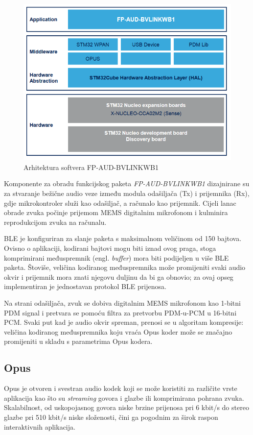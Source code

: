 \begin{figure}[ht]
	\includegraphics[width=\linewidth]{imgs/firmware_software_arch}
	\caption{Arhitektura softvera FP-AUD-BVLINKWB1}
	\label{fig:firmware_software_arch}
\end{figure}

Komponente za obradu funkcijskog paketa \textit{FP-AUD-BVLINKWB1} dizajnirane su za stvaranje bežične audio veze između modula odašiljača (Tx) i prijemnika (Rx), gdje mikrokontroler služi kao odašiljač, a računalo kao prijemnik. Cijeli lanac obrade zvuka počinje prijemom MEMS digitalnim mikrofonom i kulminira reprodukcijom zvuka na računalu.

BLE je konfiguriran za slanje paketa s maksimalnom veličinom od 150 bajtova. Ovisno o aplikaciji, kodirani bajtovi mogu biti iznad ovog praga, stoga komprimirani međuspremnik (engl. \textit{buffer}) mora biti podijeljen u više BLE paketa. Štoviše, veličina kodiranog međuspremnika može promijeniti svaki audio okvir i prijemnik mora znati njegovu duljinu da bi ga obnovio; za ovaj opseg implementiran je jednostavan protokol BLE prijenosa.

Na strani odašiljača, zvuk se dobiva digitalnim MEMS mikrofonom kao 1-bitni PDM signal i pretvara se pomoću filtra za pretvorbu PDM-u-PCM u 16-bitni PCM. Svaki put kad je audio okvir spreman, prenosi se u algoritam kompresije: veličina kodiranog međuspremnika koju vraća Opus koder može se značajno promijeniti u skladu s parametrima Opus kodera.

\subsection{Opus}
Opus je otvoren i svestran audio kodek koji se može koristiti za različite vrste aplikacija kao što su \textit{streaming} govora i glazbe ili komprimirana pohrana zvuka. Skalabilnost, od uskopojasnog govora niske brzine prijenosa pri 6 kbit/s do stereo glazbe pri 510 kbit/s niske složenosti, čini ga pogodnim za širok raspon interaktivnih aplikacija.

